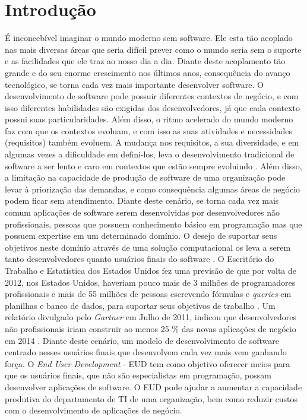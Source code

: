 \chapter[Introdução]{Introdução}

É inconcebível imaginar o mundo moderno sem software. Ele esta tão acoplado nas mais diversas áreas que seria difícil prever como o mundo seria sem o suporte e as facilidades que ele traz ao nosso dia a dia. Diante deste acoplamento tão grande e do seu enorme crescimento nos últimos anos, consequência do avanço tecnológico, se torna cada vez mais importante desenvolver software. O desenvolvimento de software pode possuir diferentes contextos de negócio, e com isso diferentes habilidades são exigidas dos desenvolvedores, já que cada contexto possui suas particularidades. Além disso, o ritmo acelerado do mundo moderno faz com que os contextos evoluam, e com isso as suas atividades e necessidades (requisitos) também evoluem. A mudança nos requisitos, a sua diversidade, e em algumas vezes a dificuldade em defini-los, leva o desenvolvimento tradicional de software a ser lento e caro em contextos que estão sempre evoluindo \cite{lieberman2006}. Além disso, a limitação na capacidade de produção de software de uma organização pode levar à priorização das demandas, e como consequência algumas áreas de negócio podem ficar sem atendimento. Diante deste cenário, se torna cada vez mais comum aplicações de software serem desenvolvidas por desenvolvedores não profissionais, pessoas que possuem conhecimento básico em programação mas que possuem expertise em um determinado domínio. O desejo de suportar seus objetivos neste domínio através de uma solução computacional os leva a serem tanto desenvolvedores quanto usuários finais do software \cite{lieberman2006}. O Escritório do Trabalho e Estatística dos Estados Unidos fez uma previsão de que por volta de 2012, nos Estados Unidos, haveriam pouco mais de 3 milhões de programadores profissionais e mais de 55 milhões de pessoas escrevendo fórmulas e \textit{queries} em planilhas e banco de dados, para suportar seus objetivos de trabalho \cite{scaffidi2005}. Um relatório divulgado pelo \textit{Gartner} em Julho de 2011, indicou que desenvolvedores não profissionais iriam construir ao menos 25 \% das novas aplicações de negócio em 2014 \cite{paterno2013}. Diante deste cenário, um modelo de desenvolvimento de software centrado nesses usuários finais que desenvolvem cada vez mais vem ganhando força. O \textit{End User Development} - EUD tem como objetivo oferecer meios para que os usuários finais, que não são especialistas em programação, possam desenvolver aplicações de software. O EUD pode ajudar a aumentar a capacidade produtiva do departamento de TI de uma organização, bem como reduzir custos com o desenvolvimento de aplicações de negócio.

